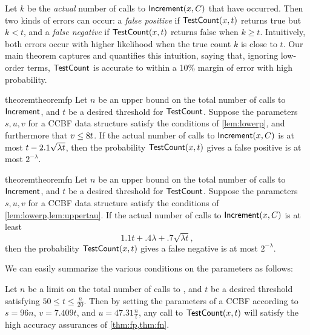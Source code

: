 Let $k$ be the \emph{actual} number of calls to $\mathsf{Increment}(x,C)$ that have occurred. Then two kinds of errors can occur: a \emph{false positive} if $\mathsf{TestCount}(x,t)$ returns true but $k<t$, and a \emph{false negative} if $\mathsf{TestCount}(x,t)$ returns false when $k\ge t$. Intuitively, both errors occur with higher likelihood when the true count $k$ is close to $t$. Our main theorem captures and quantifies this intuition, saying that, ignoring low-order terms, $\mathsf{TestCount}$ is accurate to within a 10\% margin of error with high probability.

\begin{restatable}{theorem}{theoremfp}\label{thm:fp}
    Let $n$ be an upper bound on the total number of calls to $\mathsf{Increment}$, and $t$ be a desired threshold for $\mathsf{TestCount}$. Suppose the parameters $s,u,v$ for a CCBF data structure satisfy the conditions of \cref{lem:lowerp}, and furthermore that
    $v \le 8{} t$.
    If the actual number of calls to $\mathsf{Increment}(x,C)$ is at most
    $t - 2.1\sqrt{\lambda t}$, then the probability $\mathsf{TestCount}(x,t)$ gives
    a false positive is at most $2^{-\lambda}$.
\end{restatable}

\begin{restatable}{theorem}{theoremfn}\label{thm:fn}
    Let $n$ be an upper bound on the total number of calls to $\mathsf{Increment}$, and $t$ be a desired threshold for $\mathsf{TestCount}$. Suppose the parameters $s,u,v$ for a CCBF data structure satisfy the conditions 
    of \cref{lem:lowerp,lem:uppertau}.
    If the actual number of calls to $\mathsf{Increment}(x,C)$ is at least
    \begin{equation} \label{eqn:fn}
        1.1 t + .4 \lambda + .7\sqrt{\lambda t},
    \end{equation}
    then the probability $\mathsf{TestCount}(x,t)$ gives
    a false negative is at most $2^{-\lambda}$.
\end{restatable}

We can easily summarize the various conditions on the parameters as follows:
\begin{corollary}\label{cor:params}
    Let $n$ be a limit on the total number of calls to \Increment{}, and
    $t$ be a desired threshold satisfying 
    $50 \le t \le \tfrac{n}{20}$.
    Then by setting the parameters of a CCBF according to
    $s=96n$, $v=7.409t$, and $u=47.31\tfrac{n}{t}$, any call to
    $\mathsf{TestCount}(x,t)$ will satisfy the high accuracy assurances of
    \cref{thm:fp,thm:fn}.
\end{corollary}

